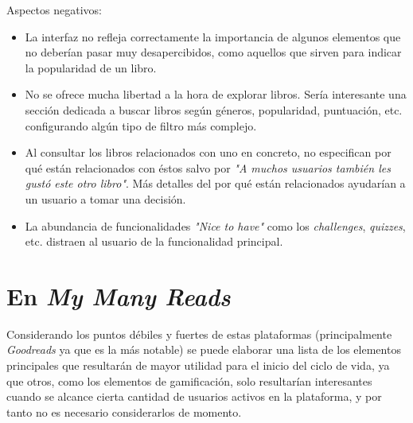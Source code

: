 Aspectos negativos:

\begin{itemize}
\item La interfaz no refleja correctamente la importancia de algunos elementos que no deberían pasar muy desapercibidos, como aquellos que sirven para indicar la popularidad de un libro.
\item No se ofrece mucha libertad a la hora de explorar libros. Sería interesante una sección dedicada a buscar libros según géneros, popularidad, puntuación, etc. configurando algún tipo de filtro más complejo.
\item Al consultar los libros relacionados con uno en concreto, no especifican por qué están relacionados con éstos salvo por \textit{"A muchos usuarios también les gustó este otro libro"}. Más detalles del por qué están relacionados ayudarían a un usuario a tomar una decisión.
\item La abundancia de funcionalidades \textit{"Nice to have"} como los \textit{challenges}, \textit{quizzes}, etc. distraen al usuario de la funcionalidad principal.
\end{itemize}

\section{En \textit{My Many Reads}}

Considerando los puntos débiles y fuertes de estas plataformas (principalmente \textit{Goodreads} ya que es la más notable) se puede elaborar una lista de los elementos principales que resultarán de mayor utilidad para el inicio del ciclo de vida, ya que otros, como los elementos de gamificación, solo resultarían interesantes cuando se alcance cierta cantidad de usuarios activos en la plataforma, y por tanto no es necesario considerarlos de momento.

